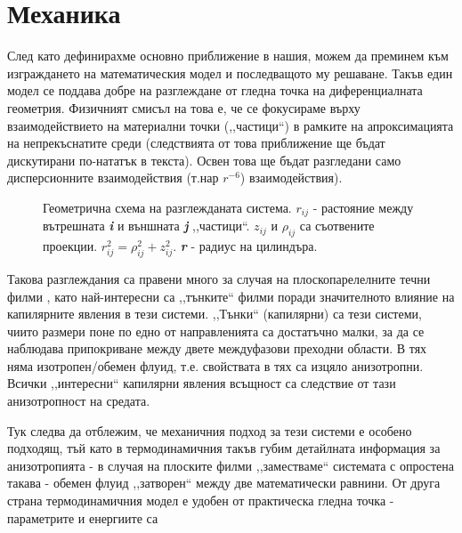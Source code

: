 \section{Механика}
След като дефинирахме основно приближение в нашия, можем да преминем към изграждането на математическия
модел и последващото му решаване. Такъв един модел се поддава добре на разглеждане от гледна точка на
диференциалната геометрия. Физичният смисъл на това е, че се фокусираме върху взаимодействието на материални
точки (,,частици``) в рамките на апроксимацията на непрекъснатите среди (следствията от това приближение
ще бъдат дискутирани по-нататък в текста). 
Освен това ще бъдат разгледани само дисперсионните взаимодействия (т.нар $r^{-6}$) взаимодействия).

\begin{figure}[h]
    \centering 
    \caption{
        Геометрична схема на разглежданата система. $r_{ij}$ - растояние между вътрешната \textbf{\textit{i}} и външната \textbf{\textit{j}} ,,частици``. $z_{ij}$ и $\rho_{ij}$ са съотвените проекции. $r_{ij}^2 = \rho_{ij}^2 + z_{ij}^2$. \textbf{\textit{r}} - радиус на цилиндъра.}
    \label{fig:cylinder_schematic}
\end{figure}

Такова разглеждания са правени много за случая на плоскопарелелните течни филми \cite{rusanov_shchekin}, като най-интересни са ,,тънките`` филми поради значителното влияние на капилярните
явления в тези системи. ,,Тънки`` (капилярни) са тези системи, чиито размери поне по едно от направленията са достатъчно малки, 
за да се наблюдава припокриване между двете междуфазови преходни области. В тях няма изотропен/обемен флуид, т.е. свойствата в тях са изцяло анизотропни. 
Всички ,,интересни`` капилярни явления всъщност са следствие от тази анизотропност на средата. 

Тук следва да отблежим, че механичния подход за тези системи е особено подходящ, тъй като в термодинамичния такъв губим детайлната информация за анизотропията - в случая на плоските филми
,,заместваме`` системата с опростена такава - обемен флуид ,,затворен`` между две математически равнини. От друга страна термодинамичния модел е удобен от практическа гледна точка - параметрите и енергиите
са 